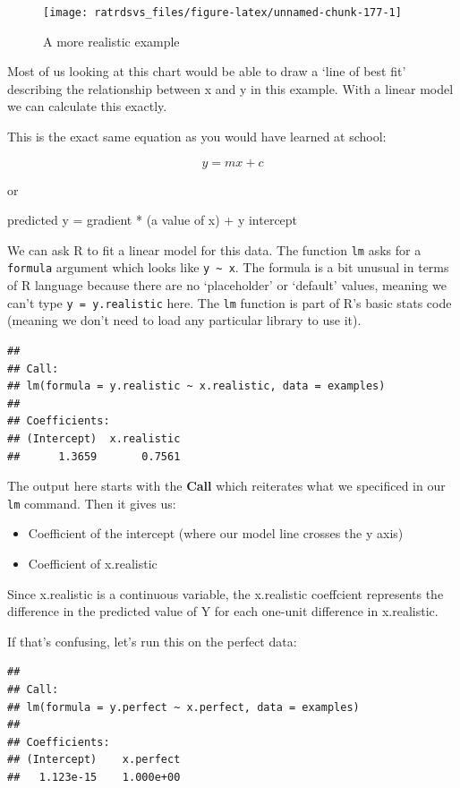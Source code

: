 \documentclass[
]{book}
\begin{document}
\begin{figure}

{\centering \texttt{[image: ratrdsvs\_files/figure-latex/unnamed-chunk-177-1]} 

}

\caption{A more realistic example}\label{fig:unnamed-chunk-177}
\end{figure}

Most of us looking at this chart would be able to draw a `line of best fit' describing the relationship between x and y in this example. With a linear model we can calculate this exactly.

This is the exact same equation as you would have learned at school:

\[ y = mx + c \]

or

predicted y = gradient * (a value of x) + y intercept

We can ask R to fit a linear model for this data. The function \texttt{lm} asks for a \texttt{formula} argument which looks like \texttt{y\ \textasciitilde{}\ x}. The formula is a bit unusual in terms of R language because there are no `placeholder' or `default' values, meaning we can't type \texttt{y\ =\ y.realistic} here. The \texttt{lm} function is part of R's basic stats code (meaning we don't need to load any particular library to use it).

\begin{verbatim}
## 
## Call:
## lm(formula = y.realistic ~ x.realistic, data = examples)
## 
## Coefficients:
## (Intercept)  x.realistic  
##      1.3659       0.7561
\end{verbatim}

The output here starts with the \textbf{Call} which reiterates what we specificed in our \texttt{lm} command. Then it gives us:

\begin{itemize}
\item
  Coefficient of the intercept (where our model line crosses the y axis)
\item
  Coefficient of x.realistic
\end{itemize}

Since x.realistic is a continuous variable, the x.realistic coeffcient represents the difference in the predicted value of Y for each one-unit difference in x.realistic.

If that's confusing, let's run this on the perfect data:

\begin{verbatim}
## 
## Call:
## lm(formula = y.perfect ~ x.perfect, data = examples)
## 
## Coefficients:
## (Intercept)    x.perfect  
##   1.123e-15    1.000e+00
\end{verbatim}
\end{document}
